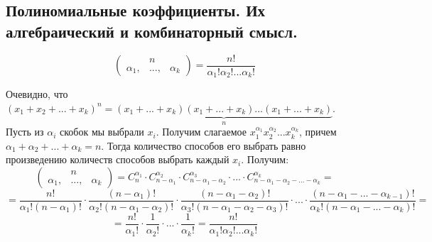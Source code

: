 \subsection{Полиномиальные коэффициенты. Их алгебраический и комбинаторный смысл.}

$$\begin{pmatrix}&n\\\alpha_1,&...,&\alpha_k\end{pmatrix} = \frac{n!}{\alpha_1!\alpha_2!...\alpha_k!}$$

Очевидно, что $(x_1 + x_2 + ... + x_k)^n = \underbrace{(x_1 + ... + x_k)(x_1 + ... + x_k)...(x_1 + ... + x_k)}_{n}$. Пусть из $\alpha_i$ скобок мы выбрали $x_i$. Получим слагаемое $x_1^{\alpha_1}x_2^{\alpha_2}...x_k^{\alpha_k}$, причем $\alpha_1 + \alpha_2 + ... + \alpha_k = n$. Тогда количество способов его выбрать равно произведению количеств способов выбрать каждый $x_i$. Получим:
$$\begin{pmatrix}&n\\\alpha_1,&...,&\alpha_k\end{pmatrix} = C^{\alpha_1}_{n} \cdot C^{\alpha_2}_{n - \alpha_1} \cdot C^{\alpha_3}_{n - \alpha_1 - \alpha_2} \cdot ... \cdot C^{\alpha_k}_{n - \alpha_1 - \alpha_2 - ... - \alpha_k} = $$
$$ =\frac{n!}{\alpha_1!(n-\alpha_1)!} \cdot \frac{(n - \alpha_1)!}{\alpha_2!(n-\alpha_1-\alpha_2)!} \cdot \frac{(n-\alpha_1-\alpha_2)!}{\alpha_3!(n-\alpha_1-\alpha_2-\alpha_3)!} \cdot ... \cdot \frac{(n-\alpha_1-...-\alpha_{k-1})!}{\alpha_k!(n-\alpha_1-...-\alpha_k)!} = $$
$$= \frac{n!}{\alpha_1!} \cdot \frac{1}{\alpha_2!} \cdot ... \cdot \frac{1}{\alpha_k!} = \frac{n!}{\alpha_1!\alpha_2!...\alpha_k!}$$